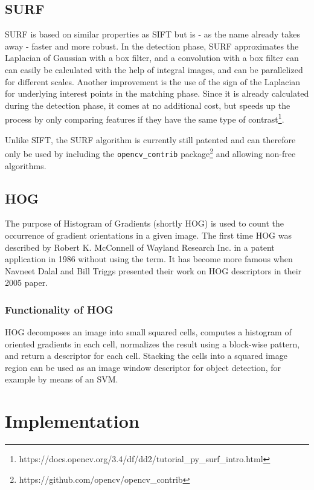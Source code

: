 \documentclass{scrartcl}
\begin{document}
\subsection{SURF}
SURF is based on similar properties as SIFT but is - as the name already takes away - faster and more robust. In the detection phase, SURF approximates the Laplacian of Gaussian with a box filter, and a convolution with a box filter can can easily be calculated with the help of integral images, and can be parallelized for different scales.
Another improvement is the use of the sign of the Laplacian for underlying interest points in the matching phase. Since it is already calculated during the detection phase, it comes at no additional cost, but speeds up the process by only comparing features if they have the same type of contrast\footnote{https://docs.opencv.org/3.4/df/dd2/tutorial\_py\_surf\_intro.html}.

Unlike SIFT, the SURF algorithm is currently still patented and can therefore only be used by including the \texttt{opencv\_contrib} package\footnote{https://github.com/opencv/opencv\_contrib} and allowing non-free algorithms.

\subsection{HOG}

The purpose of Histogram of Gradients (shortly HOG) is used to count the occurrence of gradient orientations in a given image. The first time HOG was described by Robert K. McConnell of Wayland Research Inc. in a patent application in 1986 without using the term. It has become more famous when Navneet Dalal and Bill Triggs \cite{Hog_article} presented their work on HOG descriptors in their 2005 paper.

\subsubsection{Functionality of HOG}

HOG decomposes an image into small squared cells, computes a histogram of oriented gradients in each cell, normalizes the result using a block-wise pattern, and return a descriptor for each cell. Stacking the cells into a squared image region can be used as an image window descriptor for object detection, for example by means of an SVM.

\section{Implementation}
\end{document}

